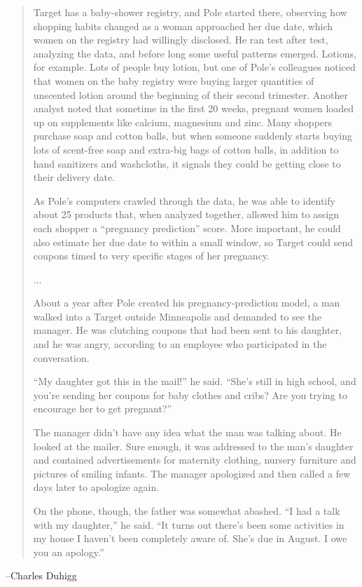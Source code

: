 \begin{quote}
Target has a baby-shower registry, and Pole started there, observing how shopping habits changed as a woman approached her due date, which women on the registry had willingly disclosed. He ran test after test, analyzing the data, and before long some useful patterns emerged. Lotions, for example. Lots of people buy lotion, but one of Pole's colleagues noticed that women on the baby registry were buying larger quantities of unscented lotion around the beginning of their second trimester. Another analyst noted that sometime in the first 20 weeks, pregnant women loaded up on supplements like calcium, magnesium and zinc. Many shoppers purchase soap and cotton balls, but when someone suddenly starts buying lots of scent-free soap and extra-big bags of cotton balls, in addition to hand sanitizers and washcloths, it signals they could be getting close to their delivery date.

As Pole's computers crawled through the data, he was able to identify about 25 products that, when analyzed together, allowed him to assign each shopper a ``pregnancy prediction'' score. More important, he could also estimate her due date to within a small window, so Target could send coupons timed to very specific stages of her pregnancy.

...


About a year after Pole created his pregnancy-prediction model, a man walked into a Target outside Minneapolis and demanded to see the manager. He was clutching coupons that had been sent to his daughter, and he was angry, according to an employee who participated in the conversation.

``My daughter got this in the mail!'' he said. ``She's still in high school, and you're sending her coupons for baby clothes and cribs? Are you trying to encourage her to get pregnant?''

The manager didn't have any idea what the man was talking about. He looked at the mailer. Sure enough, it was addressed to the man's daughter and contained advertisements for maternity clothing, nursery furniture and pictures of smiling infants. The manager apologized and then called a few days later to apologize again.

On the phone, though, the father was somewhat abashed. ``I had a talk with my daughter,'' he said. ``It turns out there's been some activities in my house I haven't been completely aware of. She's due in August. I owe you an apology.''
\end{quote}
\hfill --Charles Duhigg~\cite{targetdata}

